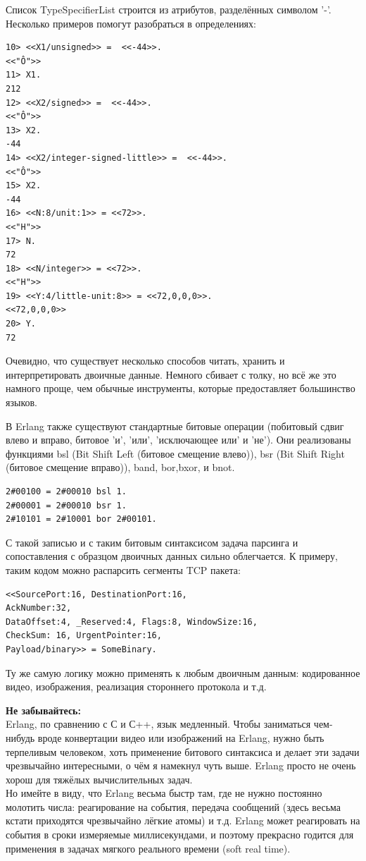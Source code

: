 \documentclass[a4paper,12pt]{report}
\newcommand{\ops}{\colorbox{lgreen}}
\begin{document}
Список TypeSpecifierList строится из атрибутов, разделённых символом '\--'.\\ 

Несколько примеров помогут разобраться в определениях:
\begin{lstlisting}[style=repl]
10> <<X1/unsigned>> =  <<-44>>.
<<"Ô">>
11> X1.
212
12> <<X2/signed>> =  <<-44>>. 
<<"Ô">>
13> X2.
-44
14> <<X2/integer-signed-little>> =  <<-44>>.
<<"Ô">>
15> X2.
-44
16> <<N:8/unit:1>> = <<72>>.
<<"H">>
17> N.
72
18> <<N/integer>> = <<72>>.
<<"H">>
19> <<Y:4/little-unit:8>> = <<72,0,0,0>>.     
<<72,0,0,0>>
20> Y.
72
\end{lstlisting}

Очевидно, что существует несколько способов читать, хранить и интерпретировать двоичные данные. Немного сбивает с толку, но всё же это намного проще, чем обычные инструменты, которые предоставляет большинство языков.

В Erlang также существуют стандартные битовые операции (побитовый сдвиг влево и вправо, битовое 'и', 'или', 'исключающее или' и 'не'). Они реализованы функциями \ops{bsl} (Bit Shift Left (битовое смещение влево)), \ops{bsr} (Bit Shift Right (битовое смещение вправо)), \ops{band}, \ops{bor},\ops{bxor}, и \ops{bnot}.
\begin{lstlisting}[style=repl]
2#00100 = 2#00010 bsl 1.
2#00001 = 2#00010 bsr 1.
2#10101 = 2#10001 bor 2#00101.
\end{lstlisting}

С такой записью и с таким битовым синтаксисом задача парсинга и сопоставления с образцом двоичных данных сильно облегчается. К примеру, таким кодом можно распарсить сегменты TCP пакета:
\begin{lstlisting}[style=repl]
<<SourcePort:16, DestinationPort:16,
AckNumber:32,
DataOffset:4, _Reserved:4, Flags:8, WindowSize:16,
CheckSum: 16, UrgentPointer:16,
Payload/binary>> = SomeBinary.
\end{lstlisting}

Ту же самую логику можно применять к любым двоичным данным: кодированное видео, изображения, реализация стороннего протокола и т.д.\\ 
\colorbox{lorange}
{
    \begin{minipage}{\linewidth}
        \textbf{Не забывайтесь:}\\ 
        Erlang, по сравнению с С и С++, язык медленный. Чтобы заниматься чем\--нибудь вроде конвертации видео или изображений на Erlang, нужно быть терпеливым человеком, хоть применение битового синтаксиса и делает эти задачи чрезвычайно интересными, о чём я намекнул чуть выше. Erlang просто не очень хорош для тяжёлых вычислительных задач.\\ 
        Но имейте в виду, что Erlang весьма быстр там, где не нужно постоянно молотить числа: реагирование на события, передача сообщений (здесь весьма кстати приходятся чрезвычайно лёгкие атомы) и т.д. Erlang может реагировать на события в сроки измеряемые миллисекундами, и поэтому прекрасно годится для применения в задачах мягкого реального времени (soft real time).\\ 
    \end{minipage}
}
\end{document}
